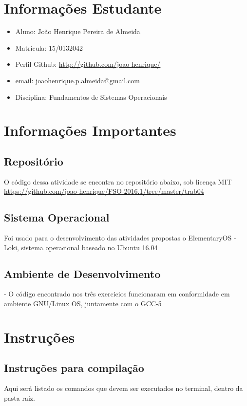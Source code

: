 \documentclass[11pt,a4paper]{article}
\begin{document}
\section{Informações Estudante}
\begin{itemize}
\item Aluno: João Henrique Pereira de Almeida
\item Matrícula: 15/0132042
\item Perfil Github: \href{http://github.com/joao-henrique/}{http://github.com/joao-henrique/}
\item email: joaohenrique.p.almeida@gmail.com
\item Disciplina: Fundamentos de Sistemas Operacionais
\end{itemize}


\section{Informações Importantes}
\subsection{Repositório}
O código dessa atividade se encontra no repositório abaixo, sob licença MIT
\url{https://github.com/joao-henrique/FSO-2016.1/tree/master/trab04}
\subsection{Sistema Operacional}

Foi usado para o desenvolvimento das atividades propostas o ElementaryOS - Loki, sistema operacional baseado no Ubuntu 16.04

\subsection{Ambiente de Desenvolvimento }
- O código encontrado nos três exercicios funcionaram em
conformidade em ambiente GNU/Linux OS, juntamente com o GCC-5

\section{Instruções}
\subsection{Instruções para compilação}
Aqui será listado os comandos que devem ser executados no terminal, dentro da pasta raiz.
\end{document}
